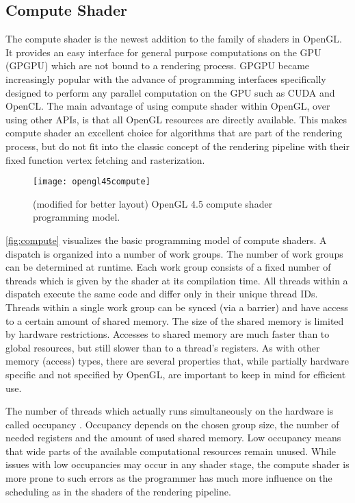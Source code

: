 \documentclass[thesis.tex]{subfiles}
\begin{document}
\subsection{Compute Shader} \label{sec:preq:compute}
The compute shader is the newest addition to the family of shaders in OpenGL.
It provides an easy interface for general purpose computations on the GPU (GPGPU) which are not bound to a rendering process.
GPGPU became increasingly popular with the advance of programming interfaces specifically designed to perform any parallel computation on the GPU such as CUDA and OpenCL.
The main advantage of using compute shader within OpenGL, over using other APIs, is that all OpenGL resources are directly available.
This makes compute shader an excellent choice for algorithms that are part of the rendering process, but do not fit into the classic concept of the rendering pipeline with their fixed function vertex fetching and rasterization.

\begin{figure}[h]
\centering
\texttt{[image: opengl45compute]}
\caption{\cite{bib:openglquickref} (modified for better layout) OpenGL 4.5 compute shader programming model.}
\label{fig:compute}
\end{figure}
\autoref{fig:compute} visualizes the basic programming model of compute shaders.
A dispatch is organized into a number of work groups. 
The number of work groups can be determined at runtime. 
Each work group consists of a fixed number of threads which is given by the shader at its compilation time.
All threads within a dispatch execute the same code and differ only in their unique thread IDs.
Threads within a single work group can be synced (via a barrier) and have access to a certain amount of shared memory.
The size of the shared memory is limited by hardware restrictions. 
Accesses to shared memory are much faster than to global resources, but still slower than to a thread's registers.
As with other memory (access) types, there are several properties that, while partially hardware specific and not specified by OpenGL, are important to keep in mind for efficient use.

The number of threads which actually runs simultaneously on the hardware is called occupancy \cite{bib:cudaprogguide, bib:amdoccupancy}.
Occupancy depends on the chosen group size, the number of needed registers and the amount of used shared memory.
Low occupancy means that wide parts of the available computational resources remain unused.
While issues with low occupancies may occur in any shader stage, the compute shader is more prone to such errors as the programmer has much more influence on the scheduling as in the shaders of the rendering pipeline.
\end{document}
